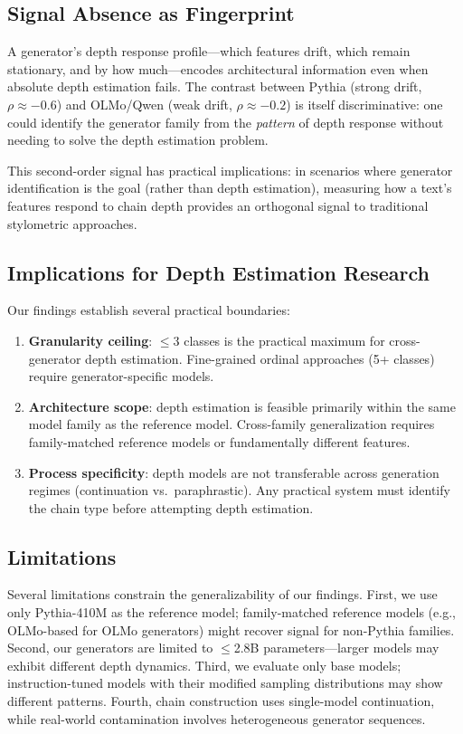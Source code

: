 \documentclass[11pt,a4paper]{article}
\begin{document}
\subsection{Signal Absence as Fingerprint}

A generator's depth response profile---which features drift, which remain stationary, and by how much---encodes architectural information even when absolute depth estimation fails. The contrast between Pythia (strong drift, $\rho\approx-0.6$) and OLMo/Qwen (weak drift, $\rho\approx-0.2$) is itself discriminative: one could identify the generator family from the \emph{pattern} of depth response without needing to solve the depth estimation problem.

This second-order signal has practical implications: in scenarios where generator identification is the goal (rather than depth estimation), measuring how a text's features respond to chain depth provides an orthogonal signal to traditional stylometric approaches.

\subsection{Implications for Depth Estimation Research}

Our findings establish several practical boundaries:

\begin{enumerate}
    \item \textbf{Granularity ceiling}: $\leq$3 classes is the practical maximum for cross-generator depth estimation. Fine-grained ordinal approaches (5+ classes) require generator-specific models.
    \item \textbf{Architecture scope}: depth estimation is feasible primarily within the same model family as the reference model. Cross-family generalization requires family-matched reference models or fundamentally different features.
    \item \textbf{Process specificity}: depth models are not transferable across generation regimes (continuation vs.\ paraphrastic). Any practical system must identify the chain type before attempting depth estimation.
\end{enumerate}

\subsection{Limitations}

Several limitations constrain the generalizability of our findings. First, we use only Pythia-410M as the reference model; family-matched reference models (e.g., OLMo-based for OLMo generators) might recover signal for non-Pythia families. Second, our generators are limited to $\leq$2.8B parameters---larger models may exhibit different depth dynamics. Third, we evaluate only base models; instruction-tuned models with their modified sampling distributions may show different patterns. Fourth, chain construction uses single-model continuation, while real-world contamination involves heterogeneous generator sequences.
\end{document}
